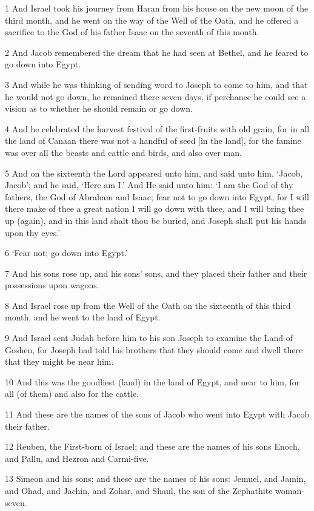 \par 1 And Israel took his journey from Haran from his house on the new moon of the third month, and he went on the way of the Well of the Oath, and he offered a sacrifice to the God of his father Isaac on the seventh of this month.
\par 2 And Jacob remembered the dream that he had seen at Bethel, and he feared to go down into Egypt.
\par 3 And while he was thinking of sending word to Joseph to come to him, and that he would not go down, he remained there seven days, if perchance he could see a vision as to whether he should remain or go down.
\par 4 And he celebrated the harvest festival of the first-fruits with old grain, for in all the land of Canaan there was not a handful of seed [in the land], for the famine was over all the beasts and cattle and birds, and also over man.
\par 5 And on the sixteenth the Lord appeared unto him, and said unto him, ‘Jacob, Jacob’; and he said, ‘Here am I.’ And He said unto him: ‘I am the God of thy fathers, the God of Abraham and Isaac; fear not to go down into Egypt, for I will there make of thee a great nation I will go down with thee, and I will bring thee up (again), and in this land shalt thou be buried, and Joseph shall put his hands upon thy eyes.’
\par 6 ‘Fear not; go down into Egypt.’
\par 7 And his sons rose up, and his sons' sons, and they placed their father and their possessions upon wagons.
\par 8 And Israel rose up from the Well of the Oath on the sixteenth of this third month, and he went to the land of Egypt.
\par 9 And Israel sent Judah before him to his son Joseph to examine the Land of Goshen, for Joseph had told his brothers that they should come and dwell there that they might be near him.
\par 10 And this was the goodliest (land) in the land of Egypt, and near to him, for all (of them) and also for the cattle.
\par 11 And these are the names of the sons of Jacob who went into Egypt with Jacob their father.
\par 12 Reuben, the First-born of Israel; and these are the names of his sons Enoch, and Pallu, and Hezron and Carmi-five.
\par 13 Simeon and his sons; and these are the names of his sons: Jemuel, and Jamin, and Ohad, and Jachin, and Zohar, and Shaul, the son of the Zephathite woman-seven.
